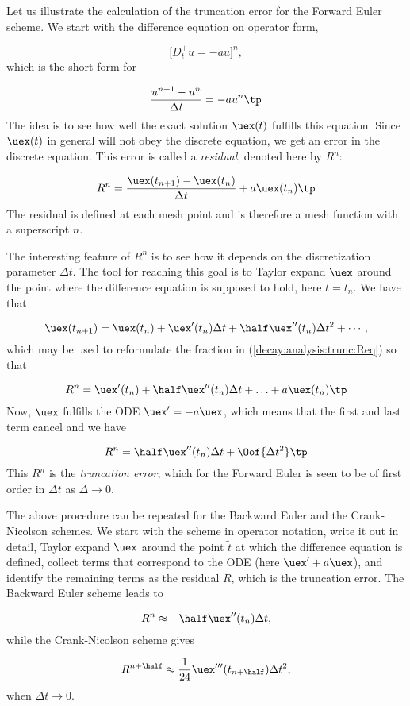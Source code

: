 \documentclass[graybox,sectrefs,envcountresetchap,open=right,final]{svmonodo}
\begin{document}
Let us illustrate the calculation of the truncation error
for the Forward Euler scheme.
We start with the difference equation on operator form,

\[ \lbrack D_t^+ u = -au\rbrack^n,\]
which is the short form for

\[ \frac{u^{n+1}-u^n}{\Delta t} = -au^n\tp\]
The idea is to see how well the exact solution $\uex(t)$ fulfills
this equation. Since $\uex(t)$ in general will not obey the
discrete equation, we get an error in the discrete equation. This
error is called
a \emph{residual}, denoted here by $R^n$:

\begin{equation}
R^n = \frac{\uex(t_{n+1})-\uex(t_n)}{\Delta t} + a\uex(t_n)
\tp
\label{decay:analysis:trunc:Req}
\end{equation}
The residual is defined at each mesh point and is therefore a mesh
function with a superscript $n$.

The interesting feature of $R^n$ is to see how it
depends on the discretization parameter $\Delta t$.
The tool for reaching
this goal is to Taylor expand $\uex$ around the point where the
difference equation is supposed to hold, here $t=t_n$.
We have that

\[ \uex(t_{n+1}) = \uex(t_n) + \uex'(t_n)\Delta t + \half\uex''(t_n)
\Delta t^2 + \cdots, \]
which may be used to reformulate the fraction in
(\ref{decay:analysis:trunc:Req}) so that

\[ R^n = \uex'(t_n) + \half\uex''(t_n)\Delta t + \ldots + a\uex(t_n)\tp\]
Now, $\uex$ fulfills the ODE $\uex'=-a\uex$, which means that the first and last
term cancel and we have

\[ R^n = \half\uex''(t_n)\Delta t + \Oof{\Delta t^2}\tp \]
This $R^n$ is the \emph{truncation error}, which for the Forward Euler is seen
to be of first order in $\Delta t$ as $\Delta \rightarrow 0$.

The above procedure can be repeated for the Backward Euler and the
Crank-Nicolson schemes. We start with the scheme in operator notation,
write it out in detail, Taylor expand $\uex$ around the point $\tilde t$
at which the difference equation is defined, collect terms that
correspond to the ODE (here $\uex' + a\uex$), and identify the remaining
terms as the residual $R$, which is the truncation error.
The Backward Euler scheme leads to

\[ R^n \approx -\half\uex''(t_n)\Delta t, \]
while the Crank-Nicolson scheme gives

\[ R^{n+\half} \approx \frac{1}{24}\uex'''(t_{n+\half})\Delta t^2,\]
when $\Delta t\rightarrow 0$.
\end{document}

